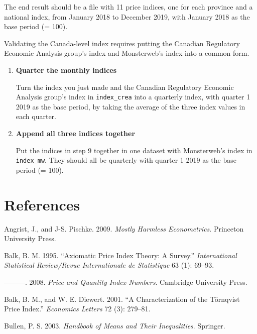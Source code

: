 \documentclass[]{article}
\begin{document}
The end result should be a file with 11 price indices, one for each province and a national index, from January 2018 to December 2019, with January 2018 as the base period (= 100).

Validating the Canada-level index requires putting the Canadian Regulatory Economic Analysis group's index and Monsterweb's index into a common form.

\begin{enumerate}
\def\labelenumi{\arabic{enumi}.}
\setcounter{enumi}{8}
\item
  \textbf{Quarter the monthly indices}

  Turn the index you just made and the Canadian Regulatory Economic Analysis group's index in \texttt{index\_crea} into a quarterly index, with quarter 1 2019 as the base period, by taking the average of the three index values in each quarter.
\item
  \textbf{Append all three indices together}

  Put the indices in step 9 together in one dataset with Monsterweb's index in \texttt{index\_mw}. They should all be quarterly with quarter 1 2019 as the base period (= 100).
\end{enumerate}

\hypertarget{references}{%
\section*{References}\label{references}}

\hypertarget{refs}{}
\leavevmode\hypertarget{ref-angrist2009}{}%
Angrist, J., and J-S. Pischke. 2009. \emph{Mostly Harmless Econometrics}. Princeton University Press.

\leavevmode\hypertarget{ref-balk1995}{}%
Balk, B. M. 1995. ``Axiomatic Price Index Theory: A Survey.'' \emph{International Statistical Review/Revue Internationale de Statistique} 63 (1): 69--93.

\leavevmode\hypertarget{ref-balk2008}{}%
---------. 2008. \emph{Price and Quantity Index Numbers}. Cambridge University Press.

\leavevmode\hypertarget{ref-balk2001}{}%
Balk, B. M., and W. E. Diewert. 2001. ``A Characterization of the Törnqvist Price Index.'' \emph{Economics Letters} 72 (3): 279--81.

\leavevmode\hypertarget{ref-bullen2003}{}%
Bullen, P. S. 2003. \emph{Handbook of Means and Their Inequalities}. Springer.
\end{document}
